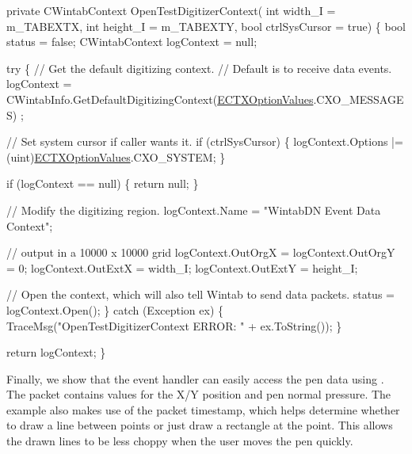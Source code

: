 \begin{DoxyCode}
\textcolor{keyword}{private} CWintabContext OpenTestDigitizerContext(
    \textcolor{keywordtype}{int} width\_I = m\_TABEXTX, \textcolor{keywordtype}{int} height\_I = m\_TABEXTY, \textcolor{keywordtype}{bool} ctrlSysCursor = \textcolor{keyword}{true})
\{
    \textcolor{keywordtype}{bool} status = \textcolor{keyword}{false};
    CWintabContext logContext = null;

    \textcolor{keywordflow}{try}
    \{
        \textcolor{comment}{// Get the default digitizing context.}
        \textcolor{comment}{// Default is to receive data events.}
        logContext = CWintabInfo.GetDefaultDigitizingContext(\mbox{\hyperlink{namespace_wintab_d_n_a701e8021b6889039ed562596a2d1bdd2}{ECTXOptionValues}}.CXO\_MESSAGES)
      ;

        \textcolor{comment}{// Set system cursor if caller wants it.}
        \textcolor{keywordflow}{if} (ctrlSysCursor)
        \{
            logContext.Options |= (uint)\mbox{\hyperlink{namespace_wintab_d_n_a701e8021b6889039ed562596a2d1bdd2}{ECTXOptionValues}}.CXO\_SYSTEM;
        \}

        \textcolor{keywordflow}{if} (logContext == null)
        \{
            \textcolor{keywordflow}{return} null;
        \}

        \textcolor{comment}{// Modify the digitizing region.}
        logContext.Name = \textcolor{stringliteral}{"WintabDN Event Data Context"};

        \textcolor{comment}{// output in a 10000 x 10000 grid}
        logContext.OutOrgX = logContext.OutOrgY = 0;
        logContext.OutExtX = width\_I;
        logContext.OutExtY = height\_I;


        \textcolor{comment}{// Open the context, which will also tell Wintab to send data packets.}
        status = logContext.Open();
    \}
    \textcolor{keywordflow}{catch} (Exception ex)
    \{
        TraceMsg(\textcolor{stringliteral}{"OpenTestDigitizerContext ERROR: "} + ex.ToString());
    \}

    \textcolor{keywordflow}{return} logContext;
\}
\end{DoxyCode}


Finally, we show that the event handler can easily access the pen data using {}. The packet contains values for the X/Y position and pen normal pressure. The example also makes use of the packet timestamp, which helps determine whether to draw a line between points or just draw a rectangle at the point. This allows the drawn lines to be less choppy when the user moves the pen quickly.


